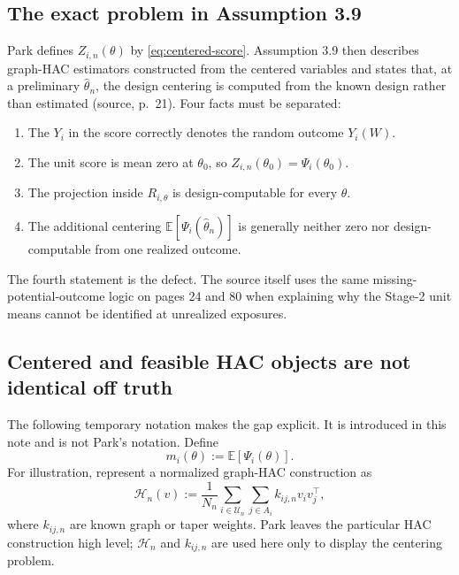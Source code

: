 \documentclass[11pt]{article}
\newcommand{\E}{\mathbb E}
\begin{document}
\subsection{The exact problem in Assumption 3.9}

Park defines \(Z_{i,n}(\theta)\) by \eqref{eq:centered-score}. Assumption 3.9
then describes graph-HAC estimators constructed from the centered variables
and states that, at a preliminary \(\widehat\theta_n\), the design centering is
computed from the known design rather than estimated (source, p.~21). Four
facts must be separated:
\begin{enumerate}[leftmargin=2em]
 \item The \(Y_i\) in the score correctly denotes the random outcome
 \(Y_i(W)\).
 \item The unit score is mean zero at \(\theta_0\), so
 \(Z_{i,n}(\theta_0)=\Psi_i(\theta_0)\).
 \item The projection inside \(R_{i,\theta}\) is design-computable for every
 \(\theta\).
 \item The additional centering \(\E[\Psi_i(\widehat\theta_n)]\) is generally
 neither zero nor design-computable from one realized outcome.
\end{enumerate}
The fourth statement is the defect. The source itself uses the same
missing-potential-outcome logic on pages 24 and 80 when explaining why the
Stage-2 unit means cannot be identified at unrealized exposures.

\subsection{Centered and feasible HAC objects are not identical off truth}

The following temporary notation makes the gap explicit. It is introduced in
this note and is not Park's notation. Define
\[
 m_i(\theta):=\E[\Psi_i(\theta)].
\]
For illustration, represent a normalized graph-HAC construction as
\begin{equation}
 \mathcal H_n(v)
 :=\frac{1}{N_n}
   \sum_{i\in\mathcal U_n}\sum_{j\in A_i}
   k_{ij,n}v_iv_j^\top,
 \label{eq:hac-operator}
\end{equation}
where \(k_{ij,n}\) are known graph or taper weights. Park leaves the particular
HAC construction high level; \(\mathcal H_n\) and \(k_{ij,n}\) are used here
only to display the centering problem.
\end{document}
